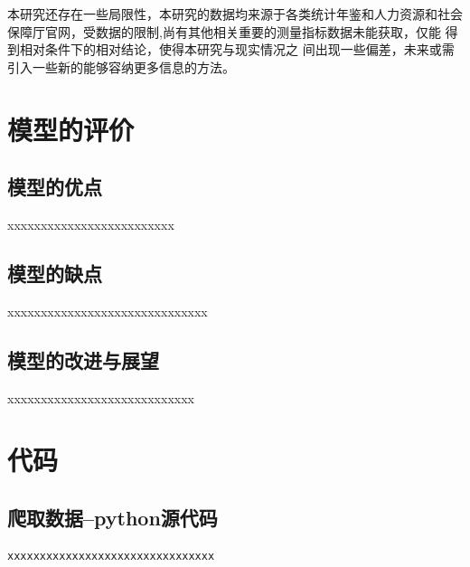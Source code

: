 \documentclass{whutmod}
\begin{document}
本研究还存在一些局限性，本研究的数据均来源于各类统计年鉴和人力资源和社会保障厅官网，受数据的限制,尚有其他相关重要的测量指标数据未能获取，仅能 得到相对条件下的相对结论，使得本研究与现实情况之 间出现一些偏差，未来或需引入一些新的能够容纳更多信息的方法。




	\section{模型的评价}
	\subsection{模型的优点}
xxxxxxxxxxxxxxxxxxxxxxxxx
	
	\subsection{模型的缺点}
xxxxxxxxxxxxxxxxxxxxxxxxxxxxxx


	\subsection{模型的改进与展望}%
xxxxxxxxxxxxxxxxxxxxxxxxxxxx
	\newpage	%
	\nocite{*}		%
	\printbibliography[title = {参考文献}]	%
	
	\newpage
	\appendix %
\section{代码}
\subsection{爬取数据--python源代码}
\begin{lstlisting}[language=python]%这里修改语言
xxxxxxxxxxxxxxxxxxxxxxxxxxxxxxxx
\end{lstlisting}
\end{document}
